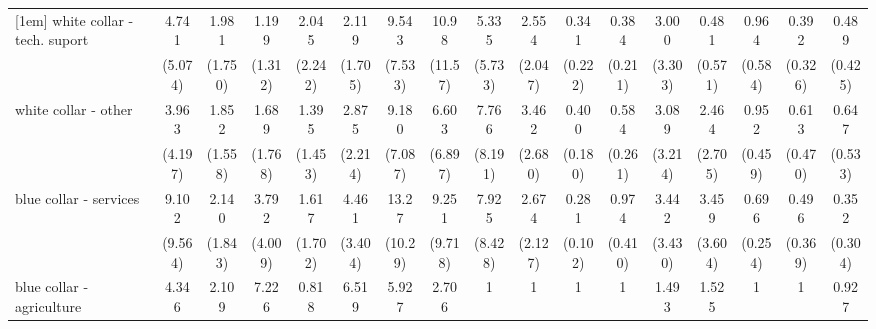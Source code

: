 {\begin{tabular}{l*{16}{c}}
[1em]
white collar - tech. suport&       4.741         &       1.981         &       1.199         &       2.045         &       2.119         &       9.543\sym{**} &       10.98\sym{*}  &       5.335         &       2.554         &       0.341         &       0.384         &       3.000         &       0.481         &       0.964         &       0.392         &       0.489         \\
                    &     (5.074)         &     (1.750)         &     (1.312)         &     (2.242)         &     (1.705)         &     (7.533)         &     (11.57)         &     (5.733)         &     (2.047)         &     (0.222)         &     (0.211)         &     (3.303)         &     (0.571)         &     (0.584)         &     (0.326)         &     (0.425)         \\
[1em]
white collar - other&       3.963         &       1.852         &       1.689         &       1.395         &       2.875         &       9.180\sym{**} &       6.603         &       7.766         &       3.462         &       0.400\sym{*}  &       0.584         &       3.089         &       2.464         &       0.952         &       0.613         &       0.647         \\
                    &     (4.197)         &     (1.558)         &     (1.768)         &     (1.453)         &     (2.214)         &     (7.087)         &     (6.897)         &     (8.191)         &     (2.680)         &     (0.180)         &     (0.261)         &     (3.214)         &     (2.705)         &     (0.459)         &     (0.470)         &     (0.533)         \\
[1em]
blue collar - services&       9.102\sym{*}  &       2.140         &       3.792         &       1.617         &       4.461         &       13.27\sym{***}&       9.251\sym{*}  &       7.925         &       2.674         &       0.281\sym{***}&       0.974         &       3.442         &       3.459         &       0.696         &       0.496         &       0.352         \\
                    &     (9.564)         &     (1.843)         &     (4.009)         &     (1.702)         &     (3.404)         &     (10.29)         &     (9.718)         &     (8.428)         &     (2.127)         &     (0.102)         &     (0.410)         &     (3.430)         &     (3.604)         &     (0.254)         &     (0.369)         &     (0.304)         \\
[1em]
blue collar - agriculture&       4.346         &       2.109         &       7.226         &       0.818         &       6.519         &       5.927         &       2.706         &           1         &           1         &           1         &           1         &       1.493         &       1.525         &           1         &           1         &       0.927         \\

\end{tabular}}
